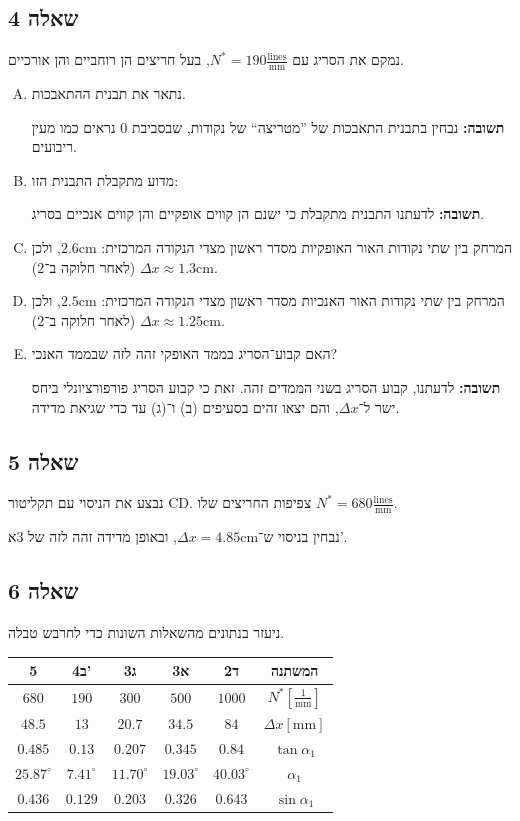 \documentclass[]{../../../tex/classes/styledArticle}
\newcommand\ag{\alpha}
\newcommand\cm{\mathrm{cm}}
\newcommand\lnsmm{\frac{\mathrm{lines}}{\mathrm{mm}}}
\begin{document}
	\subsection{שאלה 4}
	נמקם את הסריג עם $N^* = 190\frac{\mathrm{lines}}{\mathrm{mm}}$, בעל חריצים הן רוחביים והן אורכיים. 
	\begin{enumerate}[(A)]
		\item נתאר את תבנית ההתאבכות. 
		
		\textbf{תשובה: }נבחין בתבנית התאבכות של ''מטריצה`` של נקודות, שבסביבת 0 נראים כמו מעין ריבועים. 
		\item מדוע מתקבלת התבנית הזו: 
		
		\textbf{תשובה: }לדעתנו התבנית מתקבלת כי ישנם הן קווים אופקיים והן קווים אנכיים בסריג. 
		
		\item המרחק בין שתי נקודות האור האופקיות מסדר ראשון מצדי הנקודה המרכזית: ${2.6\cm}$, ולכן $\Delta x \approx \bm{1.3\cm}$ (לאחר חלוקה ב־$2$). 
		\item המרחק בין שתי נקודות האור האנכיות מסדר ראשון מצדי הנקודה המרכזית: ${2.5\cm}$, ולכן $\Delta x \approx \bm{1.25\cm}$ (לאחר חלוקה ב־$2$). 
		\item האם קבוע־הסריג בממד האופקי זהה לזה שבממד האנכי? 
		
		\textbf{תשובה: }לדעתנו, קבוע הסריג בשני הממדים זהה. זאת כי קבוע הסריג פורפורציונלי ביחס ישר ל־$\Delta x$, והם יצאו זהים בסעיפים (ב) ו־(ג) עד כדי שגיאת מדידה. 
	\end{enumerate}
	
	\subsection{שאלה 5}
	נבצע את הניסוי עם תקליטור CD. צפיפות החריצים שלו $N^* = 680\lnsmm$. 
	
	נבחין בניסוי ש־$\Delta x= 4.85\cm$, ובאופן מדידה זהה לזה של 3א'. 
	
	\subsection{שאלה 6}
	ניעזר בנתונים מהשאלות השונות כדי לחרבש טבלה. 
	
	\begin{center}
		\begin{tabular}{c|c|c|c|c|c} 
			5 & 4ב' & 3ג & 3א & 2ד & המשתנה \\ \hline
			$680$  & $190$ & $300$   & $500$  & $1000$ & $N^* \left[{\frac{1}{\mathrm{mm}}}\right]$ \\ \hline
			$48.5$ & $13$  & $20.7$ & $34.5$ & $84$   & $\Delta x \left[{{\mathrm{mm}}}\right]$ \\ \hline
			$0.485$ & $0.13$ & $0.207$ & $0.345$ & $0.84$ & ${\tan \ag_1}$ \\ \hline
			$25.87^{\circ}$ & $7.41^{\circ}$ & $11.70^{\circ}$ & $19.03^{\circ}$ & $40.03^{\circ}$ & ${\ag_1}$ \\ \hline
			$0.436$ & $0.129$ & $0.203$ & $0.326$ & $0.643$ & ${\sin \ag_1}$ \\ 
		\end{tabular}
	\end{center}
	
\end{document}
